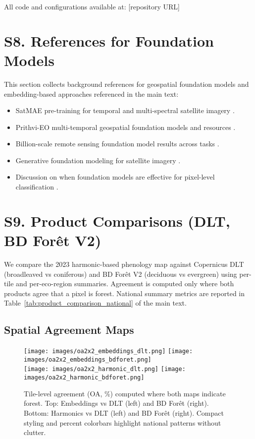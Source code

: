 \documentclass[utf8]{frontiers_suppmat}
\begin{document}
All code and configurations available at: [repository URL]

\section{S8. References for Foundation Models}

This section collects background references for geospatial foundation models and embedding-based approaches referenced in the main text:

\begin{itemize}
    \item SatMAE pre-training for temporal and multi-spectral satellite imagery \citep{Cong2022}.
    \item Prithvi-EO multi-temporal geospatial foundation models and resources \citep{Szwarcman2024PrithviEO2}.
    \item Billion-scale remote sensing foundation model results across tasks \citep{Cha2023Billion}.
    \item Generative foundation modeling for satellite imagery \citep{Khanna2023DiffusionSat}.
    \item Discussion on when foundation models are effective for pixel-level classification \citep{Xie2024FoundationEffective}.
\end{itemize}

\section{S9. Product Comparisons (DLT, BD For\^{e}t V2)}

We compare the 2023 harmonic-based phenology map against Copernicus DLT (broadleaved vs coniferous) and BD For\^{e}t V2 (deciduous vs evergreen) using per-tile and per-eco-region summaries. Agreement is computed only where both products agree that a pixel is forest. National summary metrics are reported in Table~\ref{tab:product_comparison_national} of the main text.

\subsection{Spatial Agreement Maps}

\begin{figure}[H]
    \centering
    \texttt{[image: images/oa2x2\_embeddings\_dlt.png]}\hfill
    \texttt{[image: images/oa2x2\_embeddings\_bdforet.png]}\\[0.5em]
    \texttt{[image: images/oa2x2\_harmonic\_dlt.png]}\hfill
    \texttt{[image: images/oa2x2\_harmonic\_bdforet.png]}
    \caption{Tile-level agreement (OA, \%) computed where both maps indicate forest. Top: Embeddings vs DLT (left) and BD For\^{e}t (right). Bottom: Harmonics vs DLT (left) and BD For\^{e}t (right). Compact styling and percent colorbars highlight national patterns without clutter.}
    \label{fig:oa2x2_products}
\end{figure}
\end{document}

